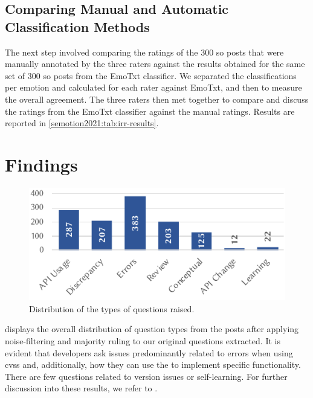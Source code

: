 \subsection{Comparing Manual and Automatic Classification Methods}

The next step involved comparing the ratings of the 300 \gls{so} posts that were manually annotated by the three raters against the results obtained for the same set of 300 \gls{so} posts from the EmoTxt classifier.
We separated the classifications per emotion and calculated \cohen{} for each rater against EmoTxt, and then \light{} to measure the overall agreement. The three raters then met together to compare and discuss the ratings from the EmoTxt classifier against the manual ratings. Results are reported in \cref{semotion2021:tab:irr-results}.

\section{Findings}\label{semotion2021:sec:findings}

\begin{figure}[t]
\centering
\includegraphics[width=.6\linewidth]{beyerclass}
\caption[Distributions of the types of questions raised]{Distribution of the types of questions raised.}
\label{semotion2021:fig:beyer-classifications}
\end{figure}

 displays the overall distribution of question types from the \SEMNumTotalNonNoisePosts{} posts after applying noise-filtering and majority ruling to our original \SEMNumTotalPostsFromSO{} questions extracted. It is evident that developers ask issues predominantly related to  errors when using \glspl{cvs} and, additionally, how they can use the  to implement specific functionality. There are few questions related to version issues or self-learning. For further discussion into these results, we refer to \citep{Cummaudo:2020icse}.

